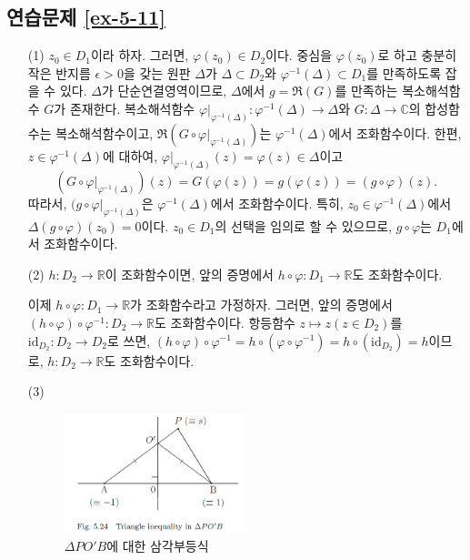 \subsection*{연습문제 \ref{ex-5-11}}
\begin{itemize}
\item[(1)] 
$z_0\in D_1$이라 하자. 그러면, $\varphi(z_0)\in D_2$이다.
중심을 $\varphi(z_0)$로 하고 충분히 작은 반지름 $\epsilon>0$을 갖는
원판 $\Delta$가 $\Delta \subset D_2$와 $\varphi^{-1}(\Delta) \subset D_1$를
만족하도록 잡을 수 있다.
$\Delta$가 단순연결영역이므로, $\Delta$에서 $g=\Re(G)$를 만족하는
복소해석함수 $G$가 존재한다.
복소해석함수 $\varphi|_{\varphi^{-1}(\Delta)}: \varphi^{-1}(\Delta)\to \Delta$와
$G: \Delta \to \mathbb C$의 합성함수는 복소해석함수이고,
$\Re(G\circ\varphi|_{\varphi^{-1}(\Delta)})$는 $\varphi^{-1}(\Delta)$에서
조화함수이다. 
한편, $z\in \varphi^{-1}(\Delta)$에 대하여, 
$\varphi|_{\varphi^{-1}(\Delta)}(z)  = \varphi(z)\in \Delta$이고
\[
(G\circ \varphi|_{\varphi^{-1}(\Delta)})(z)
= G(\varphi(z)) = g(\varphi(z)) = (g\circ \varphi)(z).
\]
따라서, $(g\circ \varphi|_{\varphi^{-1}(\Delta)}$은 
$\varphi^{-1}(\Delta)$에서 조화함수이다.
특히, $z_0\in \varphi^{-1}(\Delta)$에서 
$\Delta(g\circ \varphi)(z_0)=0$이다.
$z_0\in D_1$의 선택을 임의로 할 수 있으므로, $g\circ \varphi$는 $D_1$에서 조화함수이다.

\item[(2)] $h:D_2\to\mathbb R$이 조화함수이면, 앞의 증명에서
$h\circ \varphi : D_1 \to \mathbb R$도 조화함수이다.

이제 $h\circ \varphi : D_1 \to \mathbb R$가 조화함수라고 가정하자.
그러면, 앞의 증명에서 $(h\circ\varphi)\circ\varphi^{-1}:D_2 \to \mathbb R$도 조화함수이다.
항등함수 $z\mapsto z (z\in D_2)$를 ${\text{id}}_{D_2}: D_2 \to D_2$로 쓰면,
$(h\circ \varphi)\circ \varphi^{-1} = h\circ(\varphi \circ \varphi^{-1})
= h\circ ({\text{id}}_{D_2}) =h$이므로,
$h:D_2\to\mathbb R$도 조화함수이다. 

\item[(3)] \

\begin{figure}[h!]
\begin{center}
\includegraphics[width=0.5\textwidth]{./Solution/figs/fig-5-24}
\end{center}
\caption{$\Delta PO'B$에 대한 삼각부등식
}
\label{fig-5-24}
\end{figure}


\end{itemize}
